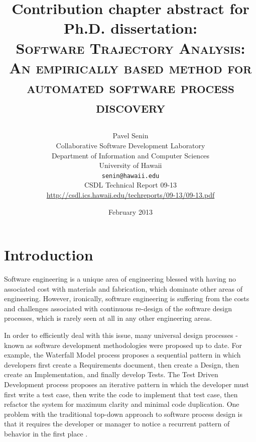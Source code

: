 \documentclass[11pt,oneside]{article}
\numberwithin{equation}{subsection}
\begin{document}
\title{Contribution chapter abstract for Ph.D. dissertation: \\
       \textsc{Software Trajectory Analysis:} \\
       \textsc{An empirically based method for automated software process discovery} \\
       \author{Pavel Senin \\
               Collaborative Software Development Laboratory \\
               Department of Information and Computer Sciences \\
               University of Hawaii \\[0.3cm]
               \texttt{senin@hawaii.edu} \\[0.3cm]
               CSDL Technical Report 09-13 \\
               \url{http://csdl.ics.hawaii.edu/techreports/09-13/09-13.pdf}
       }
       \date{February 2013}
}
\maketitle

\clearpage


\section{Introduction}
Software engineering is a unique area of engineering blessed with having no associated cost 
with materials and fabrication, which dominate other areas of engineering. 
However, ironically, software engineering is suffering from the costs and challenges
associated with continuous re-design of the software design processes, which is rarely seen 
at all in any other engineering areas. 

In order to efficiently deal with this issue, many universal design processes - known as 
software development methodologies were proposed up to date. 
For example, the Waterfall Model process proposes a sequential pattern in which developers 
first create a Requirements document, then create a Design, then create an Implementation, 
and finally develop Tests. 
The Test Driven Development process proposes an iterative pattern in which the developer 
must first write a test case, then write the code to implement that test case, then refactor 
the system for maximum clarity and minimal code duplication. One problem with the 
traditional top-down approach to software process design is that it requires
the developer or manager to notice a recurrent pattern of behavior in the first place 
\cite{citeulike:5043104}. 
\end{document}
